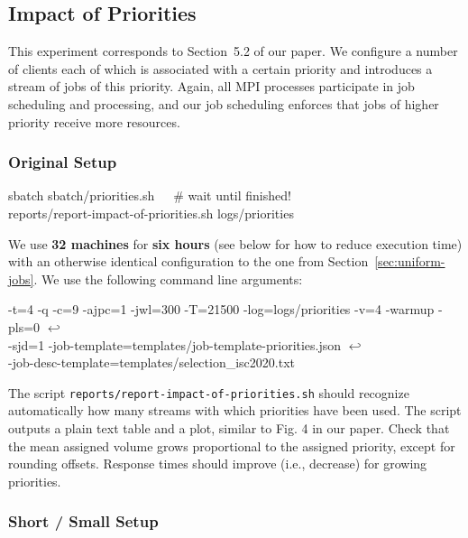 \documentclass[runningheads]{article}
\newcommand{\CR}{{\tiny$\hookleftarrow$}}
\numberwithin{dummy}{subsection}
\begin{document}
\subsection{Impact of Priorities}

This experiment corresponds to Section~5.2 of our paper.
We configure a number of clients each of which is associated with a certain priority and introduces a stream of jobs of this priority.
Again, all MPI processes participate in job scheduling and processing, and our job scheduling enforces that jobs of higher priority receive more resources.

\subsubsection{Original Setup}

\begin{tcolorbox}[
  colback=Magenta!5!white,
  colframe=Magenta!75!black,
  title={\centering Commands for Original Setup}]
\begin{ttfenvcompact}
sbatch sbatch/priorities.sh\ \ \ \# wait until finished!\\
reports/report-impact-of-priorities.sh logs/priorities
\end{ttfenvcompact}
\end{tcolorbox}

We use \textbf{32 machines} for \textbf{six hours} (see below for how to reduce execution time) with an otherwise identical configuration to the one from Section~\ref{sec:uniform-jobs}.
We use the following command line arguments:

\begin{ttfenv}
-t=4 -q -c=9 -ajpc=1 -jwl=300 -T=21500 -log=logs/priorities -v=4 -warmup -pls=0 \CR\\
-sjd=1 -job-template=templates/job-template-priorities.json \CR\\
 -job-desc-template=templates/selection\_isc2020.txt
\end{ttfenv}

The script \texttt{reports/report-impact-of-priorities.sh} should recognize automatically how many streams with which priorities have been used.
The script outputs a plain text table and a plot, similar to Fig. 4 in our paper.
Check that the mean assigned volume grows proportional to the assigned priority, except for rounding offsets.
Response times should improve (i.e., decrease) for growing priorities.

\subsubsection{Short / Small Setup}
\end{document}
